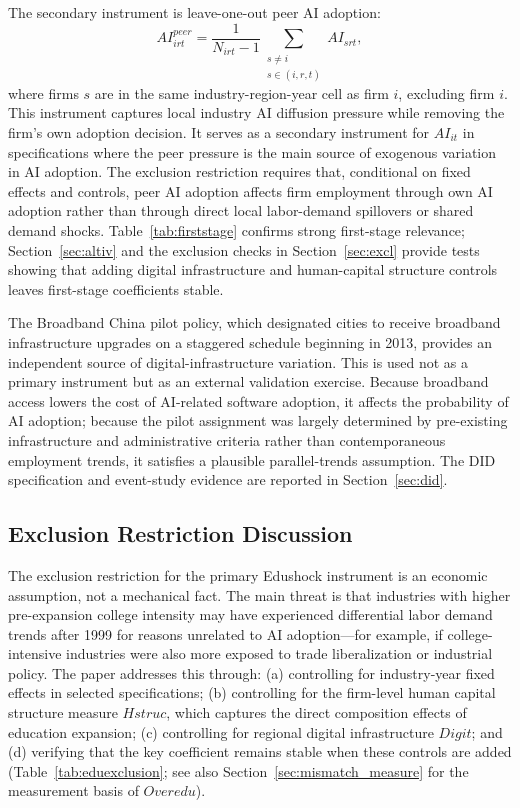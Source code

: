 \documentclass[12pt,a4paper]{article}
\theoremstyle{predstyle}
\theoremstyle{plain}
\newcommand{\Overedu}{\mathit{Overedu}}
\begin{document}
The secondary instrument is leave-one-out peer AI adoption:
\begin{equation}
AI^{peer}_{irt}
= \frac{1}{N_{irt}-1}
\sum_{\substack{s\neq i\\s\in(i,r,t)}} AI_{srt},
\label{eq:peeriv}
\end{equation}
where firms \(s\) are in the same industry-region-year cell as firm \(i\), excluding firm \(i\). This instrument captures local industry AI diffusion pressure while removing the firm's own adoption decision. It serves as a secondary instrument for \(AI_{it}\) in specifications where the peer pressure is the main source of exogenous variation in AI adoption. The exclusion restriction requires that, conditional on fixed effects and controls, peer AI adoption affects firm employment through own AI adoption rather than through direct local labor-demand spillovers or shared demand shocks. Table~\ref{tab:firststage} confirms strong first-stage relevance; Section~\ref{sec:altiv} and the exclusion checks in Section~\ref{sec:excl} provide tests showing that adding digital infrastructure and human-capital structure controls leaves first-stage coefficients stable.

The Broadband China pilot policy, which designated cities to receive broadband infrastructure upgrades on a staggered schedule beginning in 2013, provides an independent source of digital-infrastructure variation. This is used not as a primary instrument but as an external validation exercise. Because broadband access lowers the cost of AI-related software adoption, it affects the probability of AI adoption; because the pilot assignment was largely determined by pre-existing infrastructure and administrative criteria rather than contemporaneous employment trends, it satisfies a plausible parallel-trends assumption. The DID specification and event-study evidence are reported in Section~\ref{sec:did}.

\subsection{Exclusion Restriction Discussion}

The exclusion restriction for the primary Edushock instrument is an economic assumption, not a mechanical fact. The main threat is that industries with higher pre-expansion college intensity may have experienced differential labor demand trends after 1999 for reasons unrelated to AI adoption---for example, if college-intensive industries were also more exposed to trade liberalization or industrial policy. The paper addresses this through: (a) controlling for industry-year fixed effects in selected specifications; (b) controlling for the firm-level human capital structure measure \(Hstruc\), which captures the direct composition effects of education expansion; (c) controlling for regional digital infrastructure \(\mathit{Digit}\); and (d) verifying that the key coefficient remains stable when these controls are added (Table~\ref{tab:eduexclusion}; see also Section~\ref{sec:mismatch_measure} for the measurement basis of \(\Overedu\)).
\end{document}
